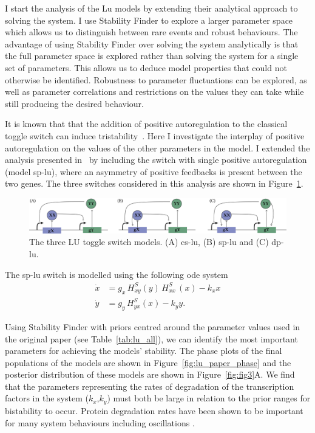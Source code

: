 I start the analysis of the Lu models by extending their analytical approach to solving the system. I use Stability Finder to explore a larger parameter space which allows us to distinguish between rare events and robust behaviours. The advantage of using Stability Finder over solving the system analytically is that the full parameter space is explored rather than solving the system for a single set of parameters. This allows us to deduce model properties that could not otherwise be identified. Robustness to parameter fluctuations can be explored, as well as parameter correlations and restrictions on the values they can take while still producing the desired behaviour. 

It is known that that the addition of positive autoregulation to the classical toggle switch can induce tristability~\autocite{Lu:2014kc}. Here I investigate the interplay of positive autoregulation on the values of the other parameters in the model. I extended the analysis presented in~\textcite{Lu:2014kc} by including the switch with single positive autoregulation (model \acrshort{sp-lu}), where an asymmetry of positive feedbacks is present between the two genes. The three switches considered in this analysis are shown in Figure~\ref{fig:lu_mods}.  


\begin{figure}[htbp]
\begin{center}
	\includegraphics[width=\textwidth]{../../chapters/chapterStabilityFinder/images/LU_diagrams.png}
	\caption[LoF caption]{\label{fig:lu_mods} The three LU toggle switch models. (A) \acrshort{cs-lu}, (B) \acrshort{sp-lu} and (C) \acrshort{dp-lu}.   }
\end{center}
\end{figure}


The \acrshort{sp-lu} switch is modelled using the following \acrshort{ode} system
\begin{align}
\dot{x} & = g_{x}\, H^{S}_{xy}(y)\, H^{S}_{xx}\,(x)-k_{x}x \\
\dot{y} & = g_{y}\,H^{S}_{yx}(x) - k_{y}y.
\end{align}


Using Stability Finder with priors centred around the parameter values used in the original paper (see Table~\ref{tab:lu_all}), we can identify the most important parameters for achieving the models' stability. The phase plots of the final populations of the models are shown in Figure~\ref{fig:lu_paper_phase} and the posterior distribution of these models are shown in Figure~\ref{fig:fig3}A. We find that the parameters representing the rates of degradation of the transcription factors in the system ($k_x$,$k_y$) must both be large in relation to the prior ranges for bistability to occur. Protein degradation rates have been shown to be important for many system behaviours including oscillations \autocite{Woods:2015vu}.

